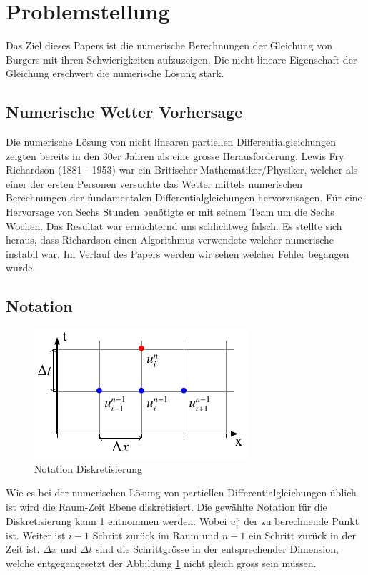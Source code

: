 %
%
\section{Problemstellung
\label{burgers:section:problemstellung}}

	Das Ziel dieses Papers ist die numerische Berechnungen der Gleichung von Burgers mit ihren Schwierigkeiten aufzuzeigen.
	Die nicht lineare Eigenschaft der Gleichung erschwert die numerische L\"osung stark.
	 
	
	\subsection{Numerische Wetter Vorhersage}
	
	Die numerische L\"osung von nicht linearen partiellen Differentialgleichungen zeigten bereits in den 30er Jahren als eine grosse Herausforderung.
	Lewis Fry Richardson (1881 - 1953) war ein Britischer Mathematiker/Physiker, welcher als einer der ersten Personen versuchte das Wetter mittels numerischen Berechnungen der fundamentalen Differentialgleichungen hervorzusagen.
	F\"ur eine Hervorsage von Sechs Stunden ben\"otigte er mit seinem Team um die Sechs Wochen.
	Das Resultat war ern\"uchternd uns schlichtweg falsch.
	Es stellte sich heraus, dass Richardson einen Algorithmus verwendete welcher numerische instabil war.
	Im Verlauf des Papers werden wir sehen welcher Fehler begangen wurde.
	
	\subsection{Notation}
	
     \begin{figure}
       \centering
       \includegraphics[height=.4\textwidth]{papers/burgers/BurgersEquation/tikz/Gitter/gitter.pdf}
       \caption{Notation Diskretisierung}
       \label{burgers:fig:Disk}
     \end{figure}
     

     Wie es bei der numerischen L\"osung von partiellen Differentialgleichungen \"ublich ist wird die Raum-Zeit Ebene  diskretisiert.
     Die gew\"ahlte Notation f\"ur die Diskretisierung kann \ref{burgers:fig:Disk} entnommen werden.
     Wobei $u_i^n$ der zu berechnende Punkt ist.
     Weiter ist $i-1$ Schritt zur\"uck im Raum und $n-1$ ein Schritt zur\"uck in der Zeit ist.
     $\Delta x$ und $\Delta t$ sind die Schrittgr\"osse in der entsprechender Dimension, welche entgegengesetzt der Abbildung \ref{burgers:fig:Disk} nicht gleich gross sein m\"ussen.
     